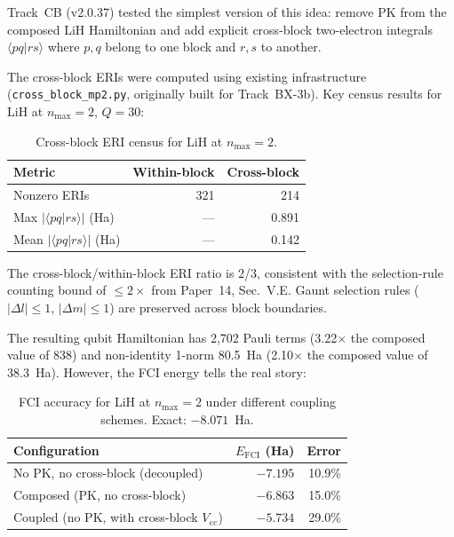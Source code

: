 \documentclass[aps,pra,twocolumn,superscriptaddress,longbibliography]{revtex4-2}
\begin{document}
Track~CB (v2.0.37) tested the simplest version of this idea: remove
PK from the composed LiH Hamiltonian and add explicit cross-block
two-electron integrals $\langle pq | rs \rangle$ where $p, q$ belong
to one block and $r, s$ to another.

The cross-block ERIs were computed using existing infrastructure
(\texttt{cross\_block\_mp2.py}, originally built for Track~BX-3b).
Key census results for LiH at $n_{\max} = 2$, $Q = 30$:

\begin{table}[h]
\caption{Cross-block ERI census for LiH at $n_{\max} = 2$.}
\label{tab:census}
\begin{ruledtabular}
\begin{tabular}{lrr}
Metric & Within-block & Cross-block \\
\hline
Nonzero ERIs & 321 & 214 \\
Max $|\langle pq|rs\rangle|$ (Ha) & --- & 0.891 \\
Mean $|\langle pq|rs\rangle|$ (Ha) & --- & 0.142 \\
\end{tabular}
\end{ruledtabular}
\end{table}

The cross-block/within-block ERI ratio is 2/3, consistent with the
selection-rule counting bound of $\le 2\times$ from Paper~14,
Sec.~V.E.  Gaunt selection rules ($|\Delta l| \le 1$,
$|\Delta m| \le 1$) are preserved across block boundaries.

The resulting qubit Hamiltonian has 2{,}702 Pauli terms (3.22$\times$ the
composed value of 838) and non-identity 1-norm 80.5~Ha (2.10$\times$ the
composed value of 38.3~Ha).  However, the FCI energy tells the real story:

\begin{table}[h]
\caption{FCI accuracy for LiH at $n_{\max} = 2$ under different
coupling schemes.  Exact: $-8.071$~Ha.}
\label{tab:fci}
\begin{ruledtabular}
\begin{tabular}{lrr}
Configuration & $E_{\mathrm{FCI}}$ (Ha) & Error \\
\hline
No PK, no cross-block (decoupled) & $-7.195$ & 10.9\% \\
Composed (PK, no cross-block) & $-6.863$ & 15.0\% \\
Coupled (no PK, with cross-block $V_{ee}$) & $-5.734$ & 29.0\% \\
\end{tabular}
\end{ruledtabular}
\end{table}
\end{document}
